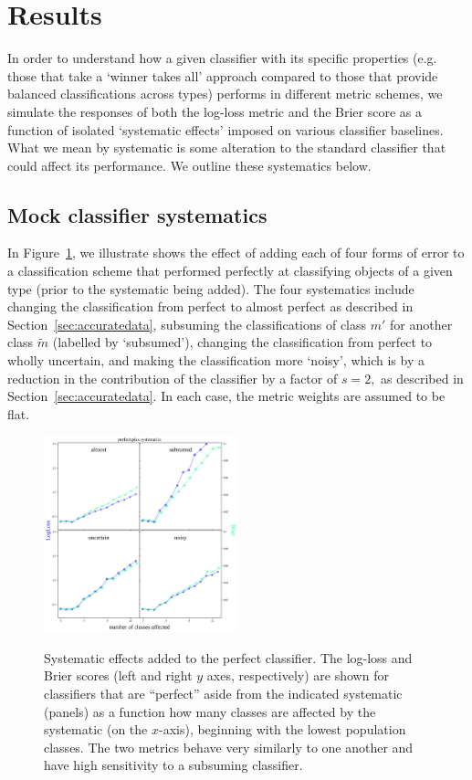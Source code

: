 \section{Results}
\label{sec:results}
In order to understand how a given classifier with its specific properties (e.g. those that take a `winner takes all' approach compared to those that provide balanced classifications across types) performs in different metric schemes, we simulate the responses of both the log-loss metric and the Brier score as a function of isolated `systematic effects' imposed on various classifier baselines.
What we mean by systematic is some alteration to the standard classifier that could affect its performance.  We outline these systematics below.

\subsection{Mock classifier systematics}
\label{sec:mockresults}

In Figure~\ref{fig:cruise}, we illustrate shows the effect of adding each of four forms of error to a classification scheme that performed perfectly at classifying objects of a given type (prior to the systematic being added).
The four systematics include changing the classification from perfect to almost perfect as described in Section~\ref{sec:accuratedata}, subsuming the classifications of class $m'$ for another class $\tilde{m}$ (labelled by `subsumed'), changing the classification from perfect to wholly uncertain, and making the classification more `noisy', which is by a reduction in the contribution of the classifier by a factor of $s=2,$ as described in Section~\ref{sec:accuratedata}.
In each case, the metric weights are assumed to be flat.

\begin{figure}
	\begin{center}
		\label{fig:cruise}
		\includegraphics[width=0.5\textwidth]{./fig/systematics_onlyperfect.png}
		\caption{Systematic effects added to the perfect classifier.
		The log-loss and Brier scores (left and right $y$ axes, respectively) are shown for classifiers that are ``perfect'' aside from the indicated systematic (panels) as a function how many classes are affected by the systematic (on the $x$-axis), beginning with the lowest population classes.
		The two metrics behave very similarly to one another and have high sensitivity to a subsuming classifier.}
	\end{center}
\end{figure}

